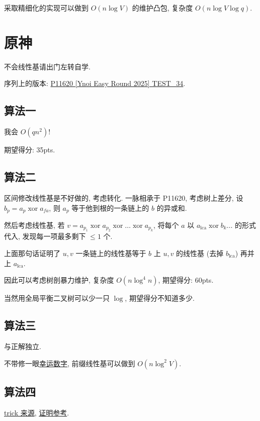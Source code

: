 \documentclass[a4paper, 12pt]{ctexart}
\begin{document}
采取精细化的实现可以做到 $O(n \log V)$ 的维护凸包, 复杂度 $O(n \log V \log q)$.

\section{原神}

不会线性基请出门左转自学.

序列上的版本: \href{https://www.luogu.com.cn/problem/P11620}{P11620 [Ynoi Easy Round 2025] TEST\_34}.

\subsection{算法一}

我会 $O(q n^2)$!

期望得分: 35pts.

\subsection{算法二}

区间修改线性基是不好做的, 考虑转化. 一脉相承于 P11620, 考虑树上差分, 设 $b_p = a_p \operatorname{xor} a_{fa}$, 
则 $a_p$ 等于他到根的一条链上的 $b$ 的异或和.

然后考虑线性基, 若 $v=a_{p_1}\operatorname{xor}a_{p_2}\operatorname{xor}\dots\operatorname{xor}a_{p_k}$, 将每个 $a$ 以 $a_{\operatorname{lca}} \operatorname{xor} b_k \dots$ 的形式代入, 发现每一项最多剩下 $\leq 1$ 个.

上面那句话证明了 $u, v$ 一条链上的线性基等于 $b$ 上 $u, v$ 的线性基 (去掉 $b_{\operatorname{lca}}$) 再并上 $a_{\operatorname{lca}}$.

因此可以考虑树剖暴力维护, 复杂度 $O(n \log^4 n)$, 期望得分: 60pts.

当然用全局平衡二叉树可以少一只 $\log$, 期望得分不知道多少.


\subsection{算法三}

与正解独立.

不带修一眼\href{https://www.luogu.com.cn/problem/P3292}{幸运数字}, 前缀线性基可以做到 $O(n \log^2 V)$.

\subsection{算法四}

\href{https://dl.ccf.org.cn/ppt/pptDetail.html?_ack=1&id=7456611705079808}{trick 来源}, 
\href{https://www.luogu.com/article/hyzcpypc}{证明参考}.
\end{document}
